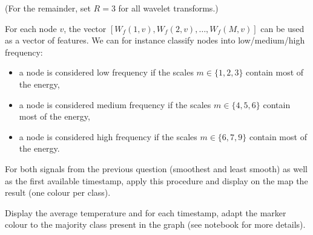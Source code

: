 \documentclass[11pt]{article}
\begin{document}
\newpage
\begin{exercise}
(For the remainder, set $R=3$ for all wavelet transforms.)

For each node $v$, the vector $[W_f(1, v), W_f(2, v),\dots, W_f(M, v)]$ can be used as a vector of features. We can for instance classify nodes into low/medium/high frequency: 
\begin{itemize}
    \item a node is considered low frequency if the scales $m\in\{1,2,3\}$ contain most of the energy,
    \item a node is considered medium frequency if the scales $m\in\{4,5,6\}$ contain most of the energy,
    \item a node is considered high frequency if the scales $m\in\{6,7,9\}$ contain most of the energy.
\end{itemize}


For both signals from the previous question (smoothest and least smooth) as well as the first available timestamp, apply this procedure and display on the map the result (one colour per class).

\end{exercise}


\newpage
\begin{exercise}
Display the average temperature and for each timestamp, adapt the marker colour to the majority class present in the graph (see notebook for more details).
\end{exercise}
\end{document}
